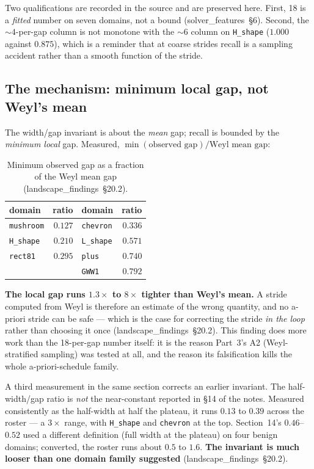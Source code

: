\documentclass[11pt]{article}
\newcommand{\file}[1]{\texttt{#1}}
\newcommand{\lf}[1]{(landscape\_findings~\S#1)}
\newcommand{\sfe}[1]{(solver\_features~\S#1)}
\begin{document}
Two qualifications are recorded in the source and are preserved here. First, 18 is a
\emph{fitted} number on seven domains, not a bound \sfe{6}. Second, the $\sim4$-per-gap column
is not monotone with the $\sim6$ column on \file{H\_shape} ($1.000$ against $0.875$), which is
a reminder that at coarse strides recall is a sampling accident rather than a smooth function
of the stride.

\subsection{The mechanism: minimum local gap, not Weyl's mean}

The width/gap invariant is about the \emph{mean} gap; recall is bounded by the \emph{minimum
local} gap. Measured, $\min(\text{observed gap})/\text{Weyl mean gap}$:

\begin{table}[htbp]
\centering
\caption{Minimum observed gap as a fraction of the Weyl mean gap \lf{20.2}.}
\label{tab:mingap}
\begin{tabular}{lrlr}
\toprule
domain & ratio & domain & ratio \\
\midrule
\file{mushroom} & $0.127$ & \file{chevron}  & $0.336$ \\
\file{H\_shape} & $0.210$ & \file{L\_shape} & $0.571$ \\
\file{rect81}   & $0.295$ & \file{plus}     & $0.740$ \\
                &         & \file{GWW1}     & $0.792$ \\
\bottomrule
\end{tabular}
\end{table}

\textbf{The local gap runs $1.3\times$ to $8\times$ tighter than Weyl's mean.} A stride computed
from Weyl is therefore an estimate of the wrong quantity, and no a-priori stride can be safe
--- which is the case for correcting the stride \emph{in the loop} rather than choosing it once
\lf{20.2}. This finding does more work than the 18-per-gap number itself: it is the reason
Part~3's A2 (Weyl-stratified sampling) was tested at all, and the reason its falsification kills
the whole a-priori-schedule family.

A third measurement in the same section corrects an earlier invariant. The half-width/gap ratio
is \emph{not} the near-constant reported in \S14 of the notes. Measured consistently as the
half-width at half the plateau, it runs $0.13$ to $0.39$ across the roster --- a $3\times$
range, with \file{H\_shape} and \file{chevron} at the top. Section~14's $0.46$--$0.52$ used a
different definition (full width at the plateau) on four benign domains; converted, the roster
runs about $0.5$ to $1.6$. \textbf{The invariant is much looser than one domain family
suggested} \lf{20.2}.
\end{document}
